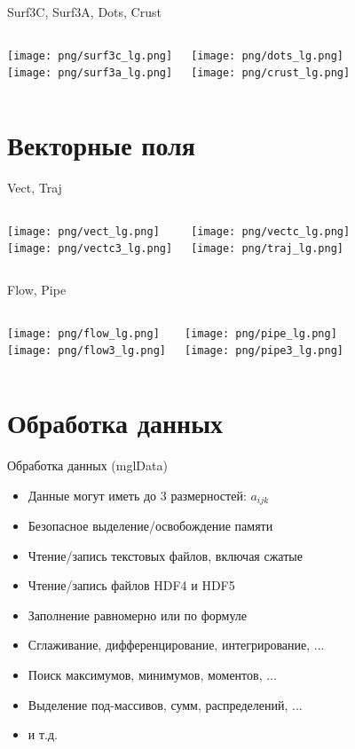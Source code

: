 \documentclass[color=usenames]{beamer}
\begin{document}
\begin{frame}{Surf3C, Surf3A, Dots, Crust}
\begin{columns}
\texttt{[image: png/surf3c\_lg.png]}\\
\texttt{[image: png/surf3a\_lg.png]}

\texttt{[image: png/dots\_lg.png]}\\
\texttt{[image: png/crust\_lg.png]}

\end{columns}
\end{frame}


\section{Векторные поля}

\begin{frame}{Vect, Traj}
\begin{columns}
\texttt{[image: png/vect\_lg.png]}\\
\texttt{[image: png/vectc3\_lg.png]}

\texttt{[image: png/vectc\_lg.png]}\\
\texttt{[image: png/traj\_lg.png]}

\end{columns}
\end{frame}

\begin{frame}{Flow, Pipe}
\begin{columns}
\texttt{[image: png/flow\_lg.png]}\\
\texttt{[image: png/flow3\_lg.png]}

\texttt{[image: png/pipe\_lg.png]}\\
\texttt{[image: png/pipe3\_lg.png]}

\end{columns}
\end{frame}


\section{Обработка данных}
\begin{frame}{Обработка данных (mglData)}
\Large
\begin{itemize}
\item Данные могут иметь до 3 размерностей: $a_{ijk}$
\item Безопасное выделение/освобождение памяти
\item Чтение/запись текстовых файлов, включая сжатые
\item Чтение/запись файлов HDF4 и HDF5 
\item Заполнение равномерно или по формуле
\item Сглаживание, дифференцирование, интегрирование, ...
\item Поиск максимумов, минимумов, моментов, ...
\item Выделение под-массивов, сумм, распределений, ...
\item и т.д.
\end{itemize}
\end{frame}
\end{document}
